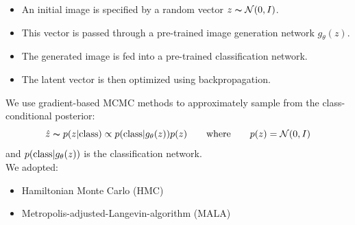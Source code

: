 \documentclass[landscape,a0b,final,a4resizeable]{include/a0poster}
\begin{document}
\begin{poster}
\begin{multicols}{3}
\begin{itemize}
\item An initial image is specified by a random vector $z \thicksim \mathcal{N}(0, I)$.
 \item This vector is passed through a pre-trained image generation network $g_\theta(z)$.
\item The generated image is fed into a pre-trained classification network.
 \item The latent vector is then optimized using backpropagation.
\end{itemize}
\vspace{1cm}
We use gradient-based MCMC methods to approximately sample from the class-conditional posterior:\\
\begin{equation*}
    \hat z \thicksim p(z|\textnormal{class}) \propto p(\textnormal{class} | g_\theta(z)) p(z) \qquad \textnormal{where} \qquad p(z) = \mathcal{N}(0, I)
\end{equation*}
\linebreak
and $p(\textnormal{class} | g_\theta(z))$ is the classification network.\\

We adopted:
\begin{itemize}
\item Hamiltonian Monte Carlo (HMC) 
\item Metropolis-adjusted-Langevin-algorithm (MALA) 
\end{itemize}
 


\end{multicols}
\end{poster}
\end{document}

